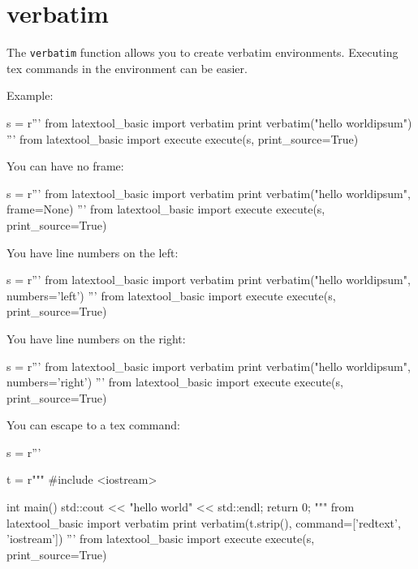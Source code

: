 \section{verbatim}

The \verb!verbatim! function allows you to 
create verbatim environments.
Executing tex commands in the environment can be easier.





Example:
\begin{python}
s = r'''
from latextool_basic import verbatim
print verbatim("hello world\nlorem ipsum")
'''
from latextool_basic import execute
execute(s, print_source=True)
\end{python}


You can have no frame:
\begin{python}
s = r'''
from latextool_basic import verbatim
print verbatim("hello world\nlorem ipsum", frame=None)
'''
from latextool_basic import execute
execute(s, print_source=True)
\end{python}




You have line numbers on the left:
\begin{python}
s = r'''
from latextool_basic import verbatim
print verbatim("hello world\nlorem ipsum", numbers='left')
'''
from latextool_basic import execute
execute(s, print_source=True)
\end{python}




You have line numbers on the right:
\begin{python}
s = r'''
from latextool_basic import verbatim
print verbatim("hello world\nlorem ipsum", numbers='right')
'''
from latextool_basic import execute
execute(s, print_source=True)
\end{python}




\begin{samepage}
You can escape to a tex command:
\begin{python}
s = r'''

t = r"""
#include <iostream>

int main()
{
    std::cout << "hello world" << std::endl;
    return 0;
}
"""
from latextool_basic import verbatim
print verbatim(t.strip(), command=['redtext', 'iostream'])
'''
from latextool_basic import execute
execute(s, print_source=True)
\end{python}
\end{samepage}

